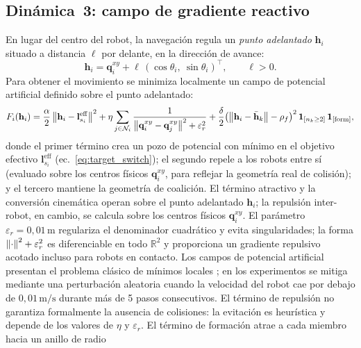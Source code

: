 \subsection{Dinámica~3: campo de gradiente reactivo}

En lugar del centro del robot, la navegación regula un \emph{punto adelantado}
$\mathbf{h}_i$ situado a distancia $\ell$ por delante, en la dirección de
avance:
\begin{equation}
  \mathbf{h}_i = \mathbf{q}_i^{xy} + \ell\,(\cos\theta_i,\ \sin\theta_i)^{\top},
  \qquad \ell > 0.
  \label{eq:lookahead}
\end{equation}
Para obtener el movimiento se minimiza localmente un campo de potencial artificial
\citep{bullo2009distributed} definido sobre el punto adelantado:
\begin{equation}
  F_i(\mathbf{h}_i) = \frac{\alpha}{2}\left\|\mathbf{h}_i - \mathbf{l}_{s_i}^{\mathrm{eff}}\right\|^2
    + \eta \sum_{j \in \mathcal{N}_i}
      \frac{1}{\left\|\mathbf{q}_i^{xy} - \mathbf{q}_j^{xy}\right\|^2 + \varepsilon_r^2}
    + \frac{\delta}{2}\bigl(\left\|\mathbf{h}_i - \bar{\mathbf{h}}_k\right\| - \rho_f\bigr)^2
    \,\mathbf{1}_{[n_k \geq 2]}\,\mathbf{1}_{[\text{form}]},
  \label{eq:potential}
\end{equation}
donde el primer término crea un pozo de potencial con mínimo en el objetivo
efectivo $\mathbf{l}_{s_i}^{\mathrm{eff}}$ (ec.~\eqref{eq:target_switch}); el
segundo repele a los robots entre sí (evaluado sobre los centros físicos
$\mathbf{q}_i^{xy}$, para reflejar la geometría real de colisión); y el tercero
mantiene la geometría de coalición. El término atractivo y la conversión cinemática
operan sobre el punto adelantado $\mathbf{h}_i$; la repulsión inter-robot, en cambio,
se calcula sobre los centros físicos $\mathbf{q}_i^{xy}$. El parámetro $\varepsilon_r = 0{,}01\,\text{m}$
regulariza el denominador cuadrático y evita singularidades; la forma
$\left\|\cdot\right\|^2 + \varepsilon_r^2$ es diferenciable en todo $\mathbb{R}^2$ y
proporciona un gradiente repulsivo acotado incluso para robots en contacto. Los
campos de potencial artificial presentan el problema clásico de mínimos locales
\citep{bullo2009distributed}; en los experimentos se mitiga mediante una
perturbación aleatoria cuando la velocidad del robot cae por debajo de
$0{,}01\,\text{m/s}$ durante más de 5 pasos consecutivos. El término de repulsión
no garantiza formalmente la ausencia de colisiones: la evitación es heurística y
depende de los valores de $\eta$ y $\varepsilon_r$. El término de formación atrae a cada miembro hacia un anillo de radio
